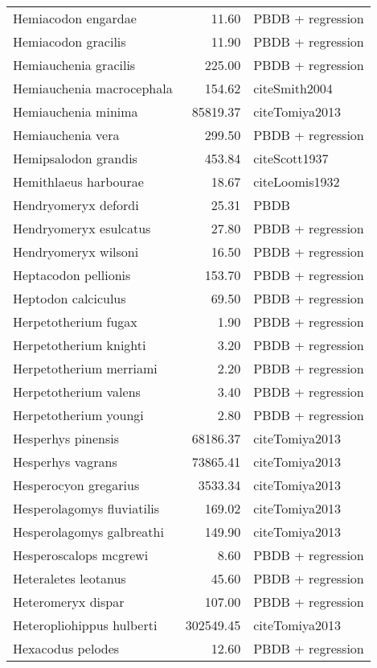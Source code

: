 \begin{table}[ht]
\begin{tabular}{lrl}
  Hemiacodon engardae & 11.60 & PBDB + regression \\ 
  Hemiacodon gracilis & 11.90 & PBDB + regression \\ 
  Hemiauchenia gracilis & 225.00 & PBDB + regression \\ 
  Hemiauchenia macrocephala & 154.62 & cite{Smith2004} \\ 
  Hemiauchenia minima & 85819.37 & cite{Tomiya2013} \\ 
  Hemiauchenia vera & 299.50 & PBDB + regression \\ 
  Hemipsalodon grandis & 453.84 & cite{Scott1937} \\ 
  Hemithlaeus harbourae & 18.67 & cite{Loomis1932} \\ 
  Hendryomeryx defordi & 25.31 & PBDB \\ 
  Hendryomeryx esulcatus & 27.80 & PBDB + regression \\ 
  Hendryomeryx wilsoni & 16.50 & PBDB + regression \\ 
  Heptacodon pellionis & 153.70 & PBDB + regression \\ 
  Heptodon calciculus & 69.50 & PBDB + regression \\ 
  Herpetotherium fugax & 1.90 & PBDB + regression \\ 
  Herpetotherium knighti & 3.20 & PBDB + regression \\ 
  Herpetotherium merriami & 2.20 & PBDB + regression \\ 
  Herpetotherium valens & 3.40 & PBDB + regression \\ 
  Herpetotherium youngi & 2.80 & PBDB + regression \\ 
  Hesperhys pinensis & 68186.37 & cite{Tomiya2013} \\ 
  Hesperhys vagrans & 73865.41 & cite{Tomiya2013} \\ 
  Hesperocyon gregarius & 3533.34 & cite{Tomiya2013} \\ 
  Hesperolagomys fluviatilis & 169.02 & cite{Tomiya2013} \\ 
  Hesperolagomys galbreathi & 149.90 & cite{Tomiya2013} \\ 
  Hesperoscalops mcgrewi & 8.60 & PBDB + regression \\ 
  Heteraletes leotanus & 45.60 & PBDB + regression \\ 
  Heteromeryx dispar & 107.00 & PBDB + regression \\ 
  Heteropliohippus hulberti & 302549.45 & cite{Tomiya2013} \\ 
  Hexacodus pelodes & 12.60 & PBDB + regression \\ 

\end{tabular}
\end{table}
